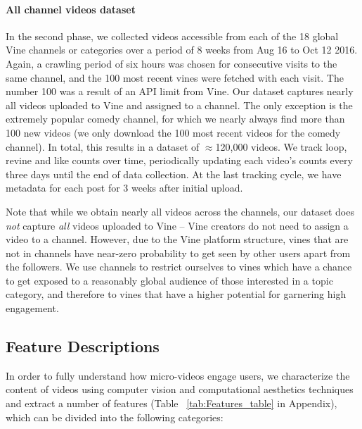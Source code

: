 \paragraph{All channel videos dataset} In the second phase, we collected 
videos accessible from each of the 18 global Vine channels or categories%
over a period of {8 weeks} from {Aug 16 to Oct 12  2016}. Again, a crawling period of six hours was chosen for consecutive visits to the same channel, and the 100 most recent vines were fetched with each visit. The number 100 was a result of an API limit from Vine. 
Our dataset captures nearly all videos uploaded to Vine and assigned to a channel. The only exception is the extremely popular comedy channel, for which we nearly always find more than 100 new videos (we only download the 100 most recent videos for the comedy channel). In total, this results in a dataset of $\approx$120,000 videos. We track  loop, revine and like counts  over time, periodically updating each video's counts every three days until the end of  data collection. At the last tracking cycle, we have metadata for each post for  3 weeks after initial  upload.

Note that while we obtain nearly all videos across the channels, our dataset does \emph{not} capture  \emph{all} videos uploaded to Vine -- Vine creators do not need to assign a video to a channel. However, due to the Vine platform structure,  vines that are not in channels have near-zero probability to get seen by other users apart from the followers. %
We use channels to restrict ourselves to vines which have a chance to get exposed to a reasonably global audience of those interested in a topic category, and therefore to vines that have a higher potential for garnering high engagement. 


\subsection{Feature Descriptions}
\label{sec:features}
In order to fully understand how micro-videos engage users, we characterize the content of videos using computer vision and computational aesthetics techniques and  extract a number of features (Table ~\ref{tab:Features_table} in Appendix), which can be divided into the following categories: 

